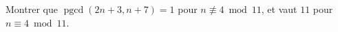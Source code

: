 Montrer que $\operatorname{pgcd}(2n + 3, n + 7) = 1$ pour $n \not\equiv 4 \bmod 11$, et vaut $11$ pour $n \equiv 4 \bmod 11$.
